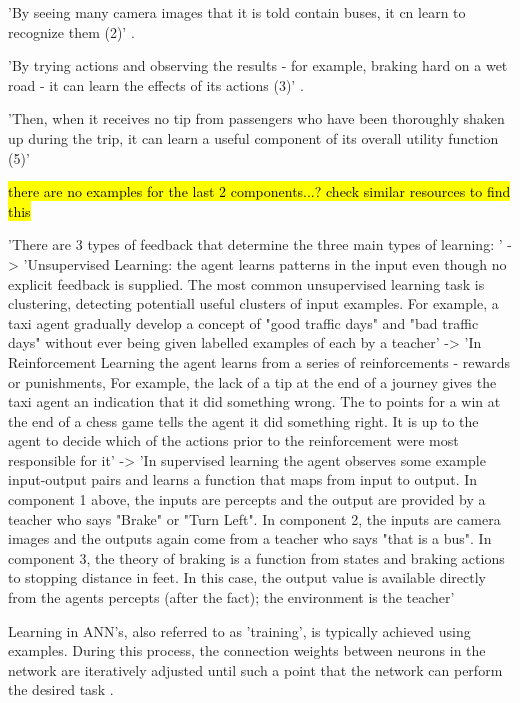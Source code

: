 'By seeing many camera images that it is told contain buses, it cn learn to recognize them (2)' \cite{russell2016artificial}.

'By trying actions and observing the results - for example, braking hard on a wet road - it can learn the effects of its actions (3)' \cite{russell2016artificial}.

'Then, when it receives no tip from passengers who have been thoroughly shaken up during the trip, it can learn a useful component of its overall utility function (5)' \cite{russell2016artificial}

\hl{there are no examples for the last 2 components...? check similar resources to find this}




'There are 3 types of feedback that determine the three main types of learning: ' \cite{russell2016artificial}
-> 'Unsupervised Learning: the agent learns patterns in the input even though no explicit feedback is supplied. The most common unsupervised learning task is clustering, detecting potentiall useful clusters of input examples. For example, a taxi agent gradually develop a concept of "good traffic days" and "bad traffic days" without ever being given labelled examples of each by a teacher'
-> 'In Reinforcement Learning the agent learns from a series of reinforcements - rewards or punishments, For example, the lack of a tip at the end of a journey gives the taxi agent an indication that it did something wrong. The to points for a win at the end of a chess game tells the agent it did something right. It is up to the agent to decide which of the actions prior to the reinforcement were most responsible for it'
-> 'In supervised learning the agent observes some example input-output pairs and learns a function that maps from input to output. In component 1 above, the inputs are percepts and the output are provided by a teacher who says "Brake" or "Turn Left". In component 2, the inputs are camera images and the outputs again come from a teacher who says "that is a bus". In component 3, the theory of braking is a function from states and braking actions to stopping distance in feet. In this case, the output value is available directly from the agents percepts (after the fact); the environment is the teacher'


Learning in ANN's, also referred to as 'training', is typically achieved using examples. During this process, the connection weights between neurons in the network are iteratively adjusted until such a point that the network can perform the desired task \cite{XinYao1999}.


